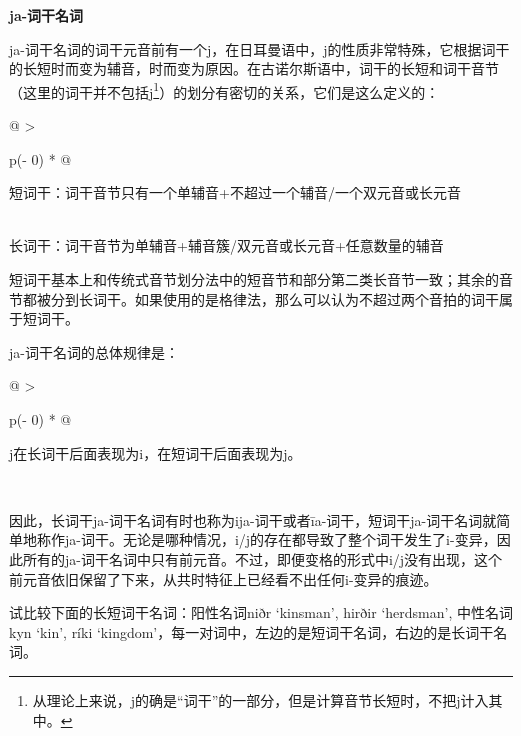 \textbf{ja-词干名词}

ja-词干名词的词干元音前有一个j，在日耳曼语中，j的性质非常特殊，它根据词干的长短时而变为辅音，时而变为原因。在古诺尔斯语中，词干的长短和词干音节（这里的词干并不包括j\footnote{从理论上来说，j的确是``词干''的一部分，但是计算音节长短时，不把j计入其中。}）的划分有密切的关系，它们是这么定义的：

\begin{longtable}[]{@{}
  >{\raggedright\arraybackslash}p{(\columnwidth - 0\tabcolsep) * }@{}}
  \toprule\noalign{}
  \begin{minipage}[b]{\linewidth}\raggedright
    短词干：词干音节只有一个单辅音+不超过一个辅音/一个双元音或长元音
  \end{minipage} \\
  \midrule\noalign{}
  \endhead
  \bottomrule\noalign{}
  \endlastfoot
  长词干：词干音节为单辅音+辅音簇/双元音或长元音+任意数量的辅音   \\
\end{longtable}

短词干基本上和传统式音节划分法中的短音节和部分第二类长音节一致；其余的音节都被分到长词干。如果使用的是格律法，那么可以认为不超过两个音拍的词干属于短词干。

ja-词干名词的总体规律是：

\begin{longtable}[]{@{}
  >{\raggedright\arraybackslash}p{(\columnwidth - 0\tabcolsep) * }@{}}
  \toprule\noalign{}
  \begin{minipage}[b]{\linewidth}\raggedright
    j在长词干后面表现为i，在短词干后面表现为j。
  \end{minipage} \\
  \midrule\noalign{}
  \endhead
  \bottomrule\noalign{}
  \endlastfoot
\end{longtable}

因此，长词干ja-词干名词有时也称为ija-词干或者īa-词干，短词干ja-词干名词就简单地称作ja-词干。无论是哪种情况，i/j的存在都导致了整个词干发生了i-变异，因此所有的ja-词干名词中只有前元音。不过，即便变格的形式中i/j没有出现，这个前元音依旧保留了下来，从共时特征上已经看不出任何i-变异的痕迹。

试比较下面的长短词干名词：阳性名词niðr `kinsman', hirðir `herdsman',
中性名词kyn `kin', ríki
`kingdom'，每一对词中，左边的是短词干名词，右边的是长词干名词。


